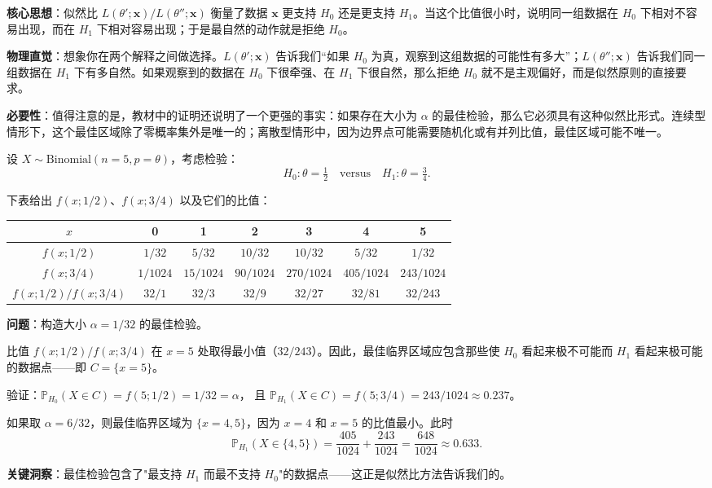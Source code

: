 \textbf{核心思想}：似然比 $L(\theta';\mathbf{x}) / L(\theta'';\mathbf{x})$ 衡量了数据 $\mathbf{x}$ 更支持 $H_0$ 还是更支持 $H_1$。当这个比值很小时，说明同一组数据在 $H_0$ 下相对不容易出现，而在 $H_1$ 下相对容易出现；于是最自然的动作就是拒绝 $H_0$。

\textbf{物理直觉}：想象你在两个解释之间做选择。$L(\theta';\mathbf{x})$ 告诉我们``如果 $H_0$ 为真，观察到这组数据的可能性有多大''；$L(\theta'';\mathbf{x})$ 告诉我们同一组数据在 $H_1$ 下有多自然。如果观察到的数据在 $H_0$ 下很牵强、在 $H_1$ 下很自然，那么拒绝 $H_0$ 就不是主观偏好，而是似然原则的直接要求。

\textbf{必要性}：值得注意的是，教材中的证明还说明了一个更强的事实：如果存在大小为 $\alpha$ 的最佳检验，那么它必须具有这种似然比形式。连续型情形下，这个最佳区域除了零概率集外是唯一的；离散型情形中，因为边界点可能需要随机化或有并列比值，最佳区域可能不唯一。
\begin{example}[二项分布下的最佳检验]\label{ex:binomial-most-powerful}
设 $X \sim \mathrm{Binomial}(n=5, p=\theta)$，考虑检验：
\[
H_0: \theta = \tfrac{1}{2} \quad \text{versus} \quad H_1: \theta = \tfrac{3}{4}.
\]

下表给出 $f(x;1/2)$、$f(x;3/4)$ 以及它们的比值：

\begin{tabular}{c|cccccc}
$x$ & 0 & 1 & 2 & 3 & 4 & 5 \\ \hline
$f(x;1/2)$ & $1/32$ & $5/32$ & $10/32$ & $10/32$ & $5/32$ & $1/32$ \\
$f(x;3/4)$ & $1/1024$ & $15/1024$ & $90/1024$ & $270/1024$ & $405/1024$ & $243/1024$ \\
$f(x;1/2)/f(x;3/4)$ & $32/1$ & $32/3$ & $32/9$ & $32/27$ & $32/81$ & $32/243$
\end{tabular}

\textbf{问题}：构造大小 $\alpha = 1/32$ 的最佳检验。

比值 $f(x;1/2)/f(x;3/4)$ 在 $x=5$ 处取得最小值（$32/243$）。因此，最佳临界区域应包含那些使 $H_0$ 看起来极不可能而 $H_1$ 看起来极可能的数据点——即 $C = \{x = 5\}$。

验证：$\mathbb{P}_{H_0}(X \in C) = f(5; 1/2) = 1/32 = \alpha$，
且 $\mathbb{P}_{H_1}(X \in C) = f(5; 3/4) = 243/1024 \approx 0.237$。

如果取 $\alpha = 6/32$，则最佳临界区域为 $\{x = 4, 5\}$，因为 $x=4$ 和 $x=5$ 的比值最小。此时
\[
\mathbb{P}_{H_1}(X \in \{4,5\}) = \frac{405}{1024} + \frac{243}{1024} = \frac{648}{1024} \approx 0.633.
\]

\textbf{关键洞察}：最佳检验包含了"最支持 $H_1$ 而最不支持 $H_0$"的数据点——这正是似然比方法告诉我们的。\end{example}

